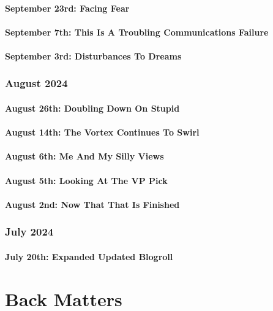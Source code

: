 \documentclass[12pt,letterpaper]{report}
\begin{document}
\subsection{September 23rd: Facing Fear}

\subsection{September 7th: This Is A Troubling Communications Failure}

\subsection{September 3rd: Disturbances To Dreams}

\section{August 2024}
\subsection{August 26th: Doubling Down On Stupid}

\subsection{August 14th: The Vortex Continues To Swirl}

\subsection{August 6th: Me And My Silly Views}

\subsection{August 5th: Looking At The VP Pick}

\subsection{August 2nd: Now That That Is Finished}

\section{July 2024}
\subsection{July 20th: Expanded Updated Blogroll}

\part{Back Matters}
\end{document}
